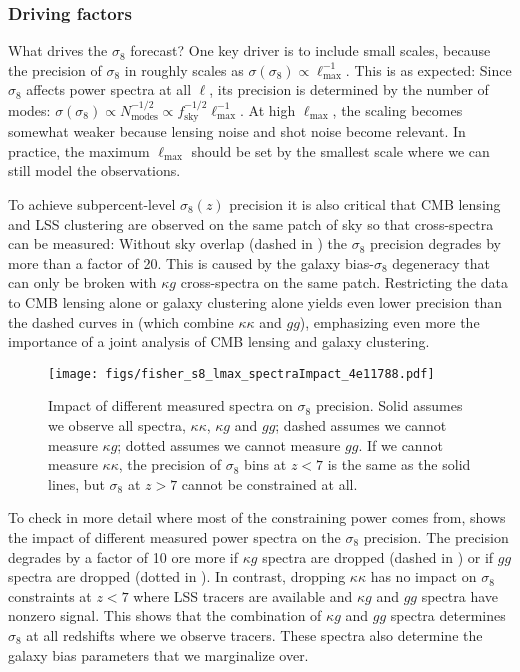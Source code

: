 \documentclass[prd,superscriptaddress,floatfix,notitlepage,nofootinbib,reprint]{revtex4-1} %
\begin{document}
\subsubsection{Driving factors}

What drives the $\sigma_8$ forecast?
One key driver is to include small scales, because the precision of $\sigma_8$ in  roughly scales as $\sigma(\sigma_8)\propto \ell_\mathrm{max}^{-1}$.
This is as expected: Since $\sigma_8$ affects power spectra at all $\ell$, its precision is  determined by the number of modes: $\sigma(\sigma_8)\propto N_\mathrm{modes}^{-1/2}\propto f_\mathrm{sky}^{-1/2}\ell_\mathrm{max}^{-1}$.
At high $\ell_\mathrm{max}$, the scaling becomes somewhat weaker because lensing noise and shot noise become relevant.
In practice, the maximum $\ell_\mathrm{max}$ should be set by the smallest scale where we can still model the observations.

To achieve subpercent-level $\sigma_8(z)$ precision it is also critical that CMB lensing and LSS clustering are observed on the same patch of sky so that cross-spectra can be measured:
Without sky overlap (dashed in ) the $\sigma_8$ precision degrades by more than a factor of 20.
This is caused by the galaxy bias-$\sigma_8$ degeneracy that can only be broken with $\kappa g$ cross-spectra on the same patch.
Restricting the data to CMB lensing alone or galaxy clustering alone yields even lower precision than the dashed curves in  (which combine $\kappa\kappa$ and $gg$), emphasizing even more the importance of a joint analysis of CMB lensing and galaxy clustering. 


\begin{figure}[tbp]
\texttt{[image: figs/fisher\_s8\_lmax\_spectraImpact\_4e11788.pdf]}
\caption{Impact of different measured spectra on $\sigma_8$ precision.  Solid assumes we observe all spectra, $\kappa\kappa$, $\kappa g$ and $gg$; dashed assumes we cannot measure $\kappa g$; dotted assumes we cannot measure $gg$.
If we cannot measure $\kappa\kappa$, the precision of $\sigma_8$ bins at $z<7$ is the same as the solid lines, but $\sigma_8$ at $z>7$  cannot be constrained at all.
}
\label{fig:s8_lmax_spectraImpact}
\end{figure}

To check in more detail where most of the constraining power comes from,  shows the impact of different measured power spectra on the $\sigma_8$ precision.
The precision degrades by a factor of 10 ore more if $\kappa g$ spectra are dropped (dashed in ) or if $gg$ spectra are dropped (dotted in ). 
In contrast, dropping $\kappa\kappa$ has no impact on $\sigma_8$ constraints at $z<7$ where LSS tracers are available and $\kappa g$ and $gg$ spectra have nonzero signal.
This shows that the combination of $\kappa g$ and $gg$ spectra determines $\sigma_8$ at all redshifts where we observe tracers.  These spectra also determine the galaxy bias parameters that we marginalize over.
\end{document}
